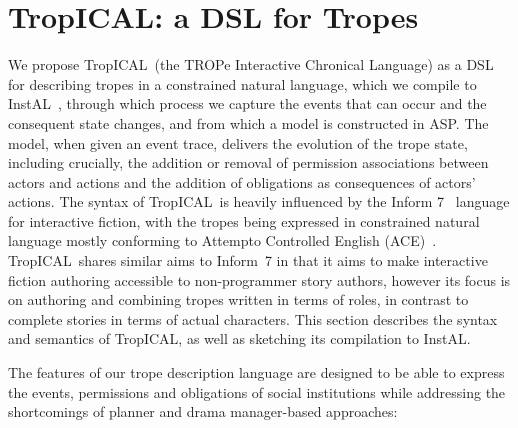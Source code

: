 \documentclass[11pt]{report}
\def\tropical{TropICAL}
\begin{document}
\section{TropICAL: a DSL for Tropes} %
\label{sec:tropical}

We propose \tropical\ (the TROPe Interactive Chronical Language) as a DSL for describing tropes in a constrained natural language, which we compile to InstAL~\citep{cliffe2007specifying}, through which process we capture the events that can occur and the consequent state changes, and from which a model is constructed in ASP.  The model, when given an event trace, delivers the evolution of the trope state, including crucially, the addition or removal of permission associations between actors and actions and the addition of obligations as consequences of actors' actions.  The syntax of \tropical\ is heavily influenced by the Inform 7~\citep{reed2010creating} language for interactive fiction, with the tropes being expressed in constrained natural language mostly conforming to Attempto Controlled English (ACE)~\citep{fuchs1996attempto}. \tropical\ shares similar aims to Inform~7 in that it aims to make interactive fiction authoring accessible to non-programmer story authors, however its focus is on authoring and combining tropes written in terms of roles, in contrast to complete stories in terms of actual characters. This section describes the syntax and semantics of \tropical, as well as sketching its compilation to InstAL.

The features of our trope description language are designed to be able to express the events, permissions and obligations of social institutions while addressing the shortcomings of planner and drama manager-based approaches:
\end{document}
